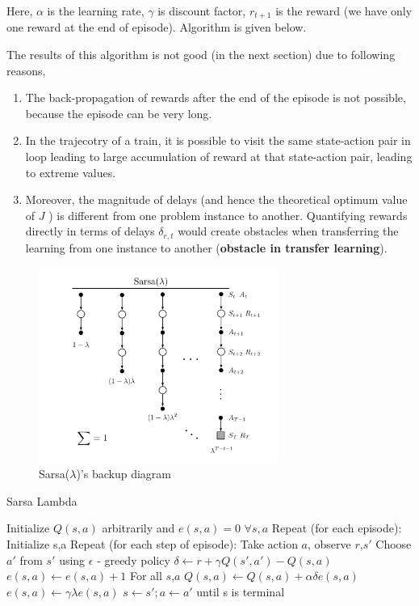 Here, $\alpha$ is the learning rate, $\gamma$ is discount factor, $r_{t+1}$ is the reward (we have only 
one reward at the end of episode). Algorithm is given below.
\vspace{\baselineskip}

The results of this algorithm is not good (in the next section) due to following reasons,
\begin{enumerate}
\item The back-propagation of rewards
      after the end of the episode is not possible, because the episode
can be very long.
\item In the trajecotry of a train, it is possible to visit the same state-action pair in loop leading to 
large accumulation of reward at that state-action pair, leading to extreme values.
\item Moreover, the magnitude of delays (and hence the theoretical
optimum value of $J$ ) is different from one problem instance
to another. Quantifying rewards directly in terms of delays
$\delta_{r,t}$ would create obstacles when transferring the learning from
one instance to another (\textbf{obstacle in transfer learning}).
\end{enumerate}
\begin{figure}[!htb]
    \centering
    \includegraphics[width=0.7\textwidth]{backup_sarsa}
    \caption{ Sarsa($\lambda$)'s backup diagram }
    \label{image-myimage20}
\end{figure}

\begin{algorithm}[H]
\caption{ Sarsa Lambda }
\begin{algorithmic}
\State Initialize $Q(s,a)$ arbitrarily and $e(s,a) = 0$ $\forall s,a$
\State Repeat (for each episode):
\State \;\;\;\;\;\;Initialize s,a    
\State \;\;\;\;\;\;Repeat (for each step of episode):
\State \;\;\;\;\;\;\;\;\;\;\;\; Take action $a$, observe $r$,$s'$
\State \;\;\;\;\;\;\;\;\;\;\;\; Choose $a'$ from $s'$ using $\epsilon$ - greedy policy
\State \;\;\;\;\;\;\;\;\;\;\;\; $\delta \gets r + \gamma Q(s',a') - Q(s,a)$
\State \;\;\;\;\;\;\;\;\;\;\;\; $e(s,a) \gets e(s,a) + 1$
\State \;\;\;\;\;\;\;\;\;\;\;\; For all $s$,$a$
\State \;\;\;\;\;\;\;\;\;\;\;\;\;\;\;\;\;\; $Q(s,a) \gets Q(s,a) + \alpha \delta e(s,a)$
\State \;\;\;\;\;\;\;\;\;\;\;\;\;\;\;\;\;\; $e(s,a) \gets \gamma \lambda e(s,a)$
\State \;\;\;\;\;\;\;\;\;\;\;\; $s \gets s'; a \gets a'$
\State \;\;\;\;\;\; until s is terminal
\end{algorithmic}
\end{algorithm}


